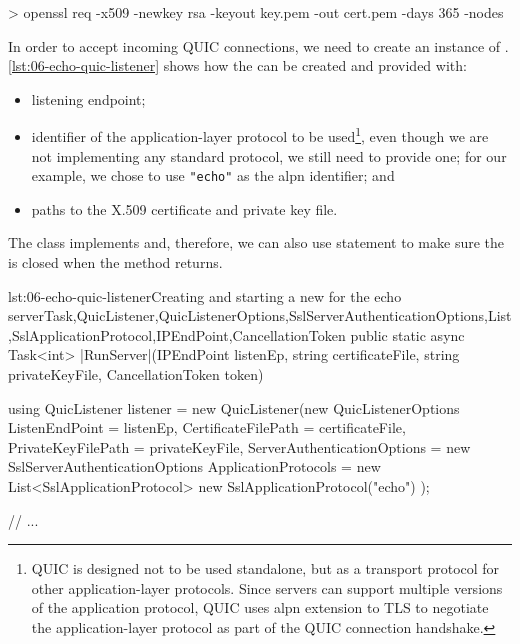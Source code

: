 \begin{myVerbatim}
> openssl req -x509 -newkey rsa -keyout key.pem -out cert.pem -days 365 -nodes
\end{myVerbatim}

In order to accept incoming QUIC connections, we need to create an instance of \QuicListener{}.
\autoref{lst:06-echo-quic-listener} shows how the \QuicListener{} can be created and provided with:

\begin{itemize}

  \item listening endpoint;

  \item identifier of the application-layer protocol to be used\footnote{QUIC is designed not to be
        used standalone, but as a transport protocol for other application-layer protocols. Since
        servers can support multiple versions of the application protocol, QUIC uses \gls{alpn}
        extension to TLS to negotiate the application-layer protocol as part of the QUIC connection
        handshake.}, even though we are not implementing any standard protocol, we still need to
        provide one; for our example, we chose to use \texttt{"echo"} as the \gls{alpn} identifier;
        and

  \item paths to the X.509 certificate and private key file.

\end{itemize}

The \QuicListener{} class implements  and, therefore, we can also use
 statement to make sure the \QuicListener{} is closed when the method returns.

\begin{myListingCsharp}{lst:06-echo-quic-listener}{Creating and starting a new \QuicListener{} for the echo server}{Task,QuicListener,QuicListenerOptions,SslServerAuthenticationOptions,List,SslApplicationProtocol,IPEndPoint,CancellationToken}{}
public static async Task<int> |RunServer|(IPEndPoint listenEp,
    string certificateFile, string privateKeyFile, CancellationToken token)
{
    using QuicListener listener = new QuicListener(new QuicListenerOptions
    {
        ListenEndPoint = listenEp,
        CertificateFilePath = certificateFile,
        PrivateKeyFilePath = privateKeyFile,
        ServerAuthenticationOptions = new SslServerAuthenticationOptions
        {
            ApplicationProtocols = new List<SslApplicationProtocol>
            {
                new SslApplicationProtocol("echo")
            }
        }
    });

    // ...
}
\end{myListingCsharp}

